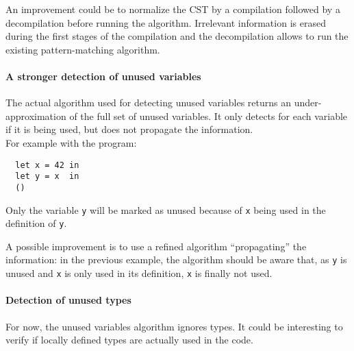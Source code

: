 \documentclass[10pt,a4paper]{article}
\begin{document}
An improvement could be to normalize the CST by a compilation followed by a decompilation before running the algorithm. Irrelevant information is erased during the first stages of the compilation and the decompilation allows to run the existing pattern-matching algorithm.

\paragraph{A stronger detection of unused variables}

The actual algorithm used for detecting unused variables returns an under-approximation of the full set of unused variables. It only detects for each variable if it is being used, but does not propagate the information.\\
For example with the program:
\begin{verbatim}
  let x = 42 in
  let y = x  in
  ()
\end{verbatim}
Only the variable \verb|y| will be marked as unused because of \verb|x| being used in the definition of \verb|y|.

A possible improvement is to use a refined algorithm ``propagating'' the information: in the previous example, the algorithm should be aware that, as \verb|y| is unused and \verb|x| is only used in its definition, \verb|x| is finally not used.

\paragraph{Detection of unused types}

For now, the unused variables algorithm ignores types. It could be interesting to verify if locally defined types are actually used in the code.
\end{document}
